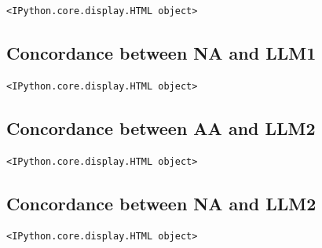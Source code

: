 \documentclass[11pt]{article}
\begin{document}
    
    \begin{Verbatim}[commandchars=\\\{\}]
<IPython.core.display.HTML object>
    \end{Verbatim}

    
    
    
    
    
    
    
    
    
    
    
    
    
    \subsection{Concordance between NA and
LLM1}\label{concordance-between-na-and-llm1}

    
    \begin{Verbatim}[commandchars=\\\{\}]
<IPython.core.display.HTML object>
    \end{Verbatim}

    
    
    
    
    
    
    
    
    
    
    
    
    
    \subsection{Concordance between AA and
LLM2}\label{concordance-between-aa-and-llm2}

    
    \begin{Verbatim}[commandchars=\\\{\}]
<IPython.core.display.HTML object>
    \end{Verbatim}

    
    
    
    
    
    
    
    
    
    
    
    
    
    \subsection{Concordance between NA and
LLM2}\label{concordance-between-na-and-llm2}

    
    \begin{Verbatim}[commandchars=\\\{\}]
<IPython.core.display.HTML object>
    \end{Verbatim}
\end{document}
